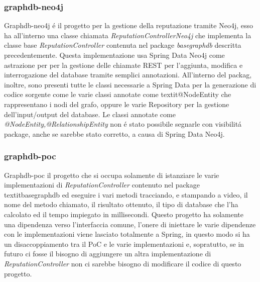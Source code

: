 \subsubsection{graphdb-neo4j}
Graphdb-neo4j \'e il progetto per la gestione della reputazione tramite Neo4j, esso ha all'interno una classe chiamata \textit{ReputationControllerNeo4j} che implementa la classe base \textit{ReputationController} contenuta nel package \textit{basegraphdb} descritta precedentemente. Questa implementazione usa Spring Data Neo4j come astrazione per per la gestione delle chiamate REST per l'aggiunta, modifica e interrogazione del database tramite semplici annotazioni. All'interno del packag, inoltre, sono presenti tutte le classi necessarie a Spring Data per la generazione di codice sorgente come le varie classi annotate come textit{@NodeEntity} che rappresentano i nodi del grafo, oppure le varie Repository per la gestione dell'input/output del database.
Le classi annotate come \textit{@NodeEntity,@RelationshipEntity} non \'e stato possibile segnarle con visibilit\'a package, anche se sarebbe stato corretto, a causa di Spring Data Neo4j.

\subsubsection{graphdb-poc}
Graphdb-poc il progetto che si occupa solamente di istanziare le varie implementazioni di \textit{ReputationController} contenuto nel package textit{basegraphdb} ed eseguire i vari metodi tracciando, e stampando a video, il nome del metodo chiamato, il risultato ottenuto, il tipo di database che l'ha calcolato ed il tempo impiegato in millisecondi.
Questo progetto ha solamente una dipendenza verso l'interfaccia comune, l'onere di iniettare le varie dipendenze con le implementazioni viene lasciato totalmente a Spring, in questo modo si ha un disaccoppiamento tra il PoC e le varie implementazioni e, sopratutto, se in futuro ci fosse il bisogno di aggiungere un altra implementazione di \textit{ReputationController} non ci sarebbe bisogno di modificare il codice di questo progetto.

